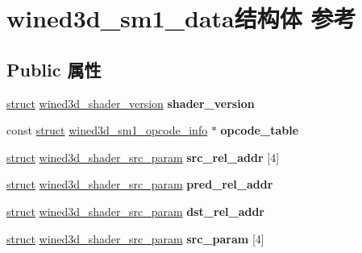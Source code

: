 \hypertarget{structwined3d__sm1__data}{}\section{wined3d\+\_\+sm1\+\_\+data结构体 参考}
\label{structwined3d__sm1__data}
\subsection*{Public 属性}
\begin{DoxyCompactItemize}
\item 
\mbox{\label{structwined3d__sm1__data_a3d62959cda174b443e0c362c87a3933b}} 
\hyperlink{interfacestruct}{struct} \hyperlink{structwined3d__shader__version}{wined3d\+\_\+shader\+\_\+version} {\bfseries shader\+\_\+version}
\item 
\mbox{\label{structwined3d__sm1__data_aa20361645dfe81a2f2bfae89adfef4e7}} 
const \hyperlink{interfacestruct}{struct} \hyperlink{structwined3d__sm1__opcode__info}{wined3d\+\_\+sm1\+\_\+opcode\+\_\+info} $\ast$ {\bfseries opcode\+\_\+table}
\item 
\mbox{\label{structwined3d__sm1__data_a510964783441ff60619e86b357d55ce4}} 
\hyperlink{interfacestruct}{struct} \hyperlink{structwined3d__shader__src__param}{wined3d\+\_\+shader\+\_\+src\+\_\+param} {\bfseries src\+\_\+rel\+\_\+addr} \mbox{[}4\mbox{]}
\item 
\mbox{\label{structwined3d__sm1__data_a05748ed8184119e98729f4a606917817}} 
\hyperlink{interfacestruct}{struct} \hyperlink{structwined3d__shader__src__param}{wined3d\+\_\+shader\+\_\+src\+\_\+param} {\bfseries pred\+\_\+rel\+\_\+addr}
\item 
\mbox{\label{structwined3d__sm1__data_a56f503e5fe5ae4306c30b54d273abf94}} 
\hyperlink{interfacestruct}{struct} \hyperlink{structwined3d__shader__src__param}{wined3d\+\_\+shader\+\_\+src\+\_\+param} {\bfseries dst\+\_\+rel\+\_\+addr}
\item 
\mbox{\label{structwined3d__sm1__data_a8bad773cb6680c82346554a836bde21a}} 
\hyperlink{interfacestruct}{struct} \hyperlink{structwined3d__shader__src__param}{wined3d\+\_\+shader\+\_\+src\+\_\+param} {\bfseries src\+\_\+param} \mbox{[}4\mbox{]}

\end{DoxyCompactItemize}
